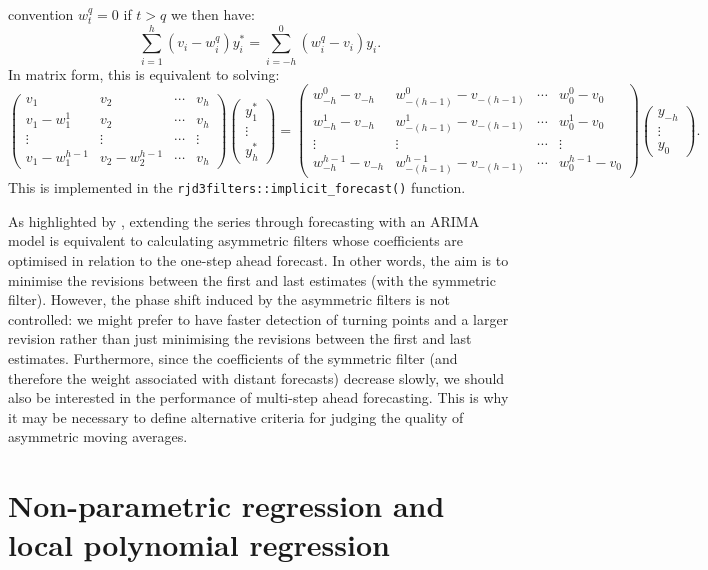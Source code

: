 \documentclass[
]{article}
\newcommand\1{\mathds{1}}
\begin{document}
convention \(w_t^q=0\) if \(t>q\) we then have: \[
\sum_{i=1}^h (v_i- w_i^q) y_i^*
=\sum_{i=-h}^0 (w_i^q-v_i)y_i.
\] In matrix form, this is equivalent to solving: \[
\scriptstyle
\begin{pmatrix}
  v_1 & v_2 & \cdots & v_h \\
  v_1 - w_1^1 & v_2 & \cdots & v_h \\
  \vdots & \vdots & \cdots & \vdots \\
   v_1 - w_1^{h-1} & v_2-w_2^{h-1} & \cdots & v_h
\end{pmatrix}
\begin{pmatrix}y_1^* \\ \vdots \\ y_h^*\end{pmatrix}=
\begin{pmatrix}
  w_{-h}^0 - v_{-h} & w_{-(h-1)}^0 - v_{-(h-1)} & \cdots & w_{0}^0 - v_{0} \\
  w_{-h}^1 - v_{-h} & w_{-(h-1)}^1 - v_{-(h-1)} & \cdots & w_{0}^1 - v_{0} \\
  \vdots & \vdots & \cdots & \vdots \\
  w_{-h}^{h-1} - v_{-h} & w_{-(h-1)}^{h-1} - v_{-(h-1)} & \cdots & w_{0}^{h-1} - v_{0}
\end{pmatrix}
\begin{pmatrix}y_{-h} \\ \vdots \\ y_0\end{pmatrix}.
\] This is implemented in the \texttt{rjd3filters::implicit\_forecast()}
function.

As highlighted by \textcite{wildischis2004}, extending the series
through forecasting with an ARIMA model is equivalent to calculating
asymmetric filters whose coefficients are optimised in relation to the
one-step ahead forecast. In other words, the aim is to minimise the
revisions between the first and last estimates (with the symmetric
filter). However, the phase shift induced by the asymmetric filters is
not controlled: we might prefer to have faster detection of turning
points and a larger revision rather than just minimising the revisions
between the first and last estimates. Furthermore, since the
coefficients of the symmetric filter (and therefore the weight
associated with distant forecasts) decrease slowly, we should also be
interested in the performance of multi-step ahead forecasting. This is
why it may be necessary to define alternative criteria for judging the
quality of asymmetric moving averages.

\section{Non-parametric regression and local polynomial
regression}\label{sec-nonparamreg}
\end{document}
